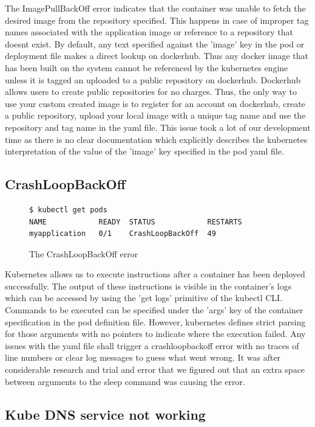 \documentclass[9pt,twocolumn,twoside]{../../styles/osajnl}
\begin{document}
The ImagePullBackOff error indicates that the container was unable to
fetch the desired image from the repository specified. This happens in
case of improper tag names associated with the application image or
reference to a repository that doesnt exist. By default, any text
specified against the 'image' key in the pod or deployment file makes
a direct lookup on dockerhub. Thus any docker image that has been
built on the system cannot be referenced by the kubernetes engine
unless it is tagged an uploaded to a public repository on
dockerhub. Dockerhub allows users to create public repositories for no
charges. Thus, the only way to use your custom created image is to
register for an account on dockerhub, create a public repository,
upload your local image with a unique tag name and use the repository
and tag name in the yaml file. This issue took a lot of our
development time as there is no clear documentation which explicitly
describes the kubernetes interpretation of the value of the 'image'
key specified in the pod yaml file.

\subsection{CrashLoopBackOff}
\begin{figure}[H]
\begin{verbatim}
$ kubectl get pods
NAME            READY  STATUS            RESTARTS  
myapplication   0/1    CrashLoopBackOff  49
\end{verbatim}
\caption{The CrashLoopBackOff error}
\vspace{-3mm}
\label{The CrashLoopBackOff error}
\end{figure}
Kubernetes allows us to execute instructions after a container has
been deployed successfully. The output of these instructions is
visible in the container's logs which can be accessed by using the
'get logs' primitive of the kubectl CLI. Commands to be executed can
be specified under the 'args' key of the container specification in
the pod definition file. However, kubernetes defines strict parsing
for those arguments with no pointers to indicate where the execution
failed. Any issues with the yaml file shall trigger a crashloopbackoff
error with no traces of line numbers or clear log messages to guess
what went wrong. It was after considerable research and trial and
error that we figured out that an extra space between arguments to the
sleep command was causing the error.


\subsection{Kube DNS service not working}
\end{document}
